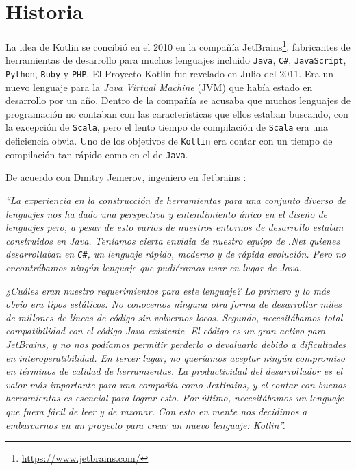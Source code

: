 \tableofcontents

\newpage

\section{Historia}
La idea de Kotlin se concibió en el 2010 en la compañía JetBrains\footnote{\url{https://www.jetbrains.com/}}, fabricantes de herramientas de desarrollo para muchos lenguajes incluido \texttt{Java}, \texttt{C\#}, \texttt{JavaScript}, \texttt{Python}, \texttt{Ruby} y \texttt{PHP}\cite{kotlin-in-action}. El Proyecto Kotlin fue revelado en Julio del 2011. Era un nuevo lenguaje para la \emph{Java Virtual Machine} (JVM) que había estado en desarrollo por un año\cite{krill}. Dentro de la compañía se acusaba que muchos lenguajes de programación no contaban con las características que ellos estaban buscando, con la excepción de \texttt{Scala}, pero el lento tiempo de compilación de \texttt{Scala} era una deficiencia obvia. Uno de los objetivos de \texttt{Kotlin} era contar con un tiempo de compilación tan rápido como en el de \texttt{Java}.

De acuerdo con Dmitry Jemerov, ingeniero en Jetbrains \cite{kotlin-in-action}: 

\emph{``La experiencia en la construcción de herramientas para una conjunto diverso de lenguajes nos ha dado una perspectiva y entendimiento único en el diseño de lenguajes pero, a pesar de esto varios de nuestros entornos de desarrollo estaban construidos en Java. Teníamos cierta envidia de nuestro equipo de .Net quienes desarrollaban en \texttt{C\#}, un lenguaje rápido, moderno y de rápida evolución. Pero no encontrábamos ningún lenguaje que pudiéramos usar en lugar de Java.}

\emph{¿Cuáles eran nuestro requerimientos para este lenguaje? Lo primero y lo más obvio era tipos estáticos. No conocemos ninguna otra forma de desarrollar miles de millones de líneas de código sin volvernos locos. Segundo, necesitábamos total compatibilidad con el código Java existente. El código es un gran activo para JetBrains, y no nos podíamos permitir perderlo o devaluarlo debido a dificultades en interoperatibilidad. En tercer lugar, no queríamos aceptar ningún compromiso en términos de calidad de herramientas. La productividad del desarrollador es el valor más importante para una compañía como JetBrains, y el contar con buenas herramientas es esencial para lograr esto. Por último, necesitábamos un lenguaje que fuera fácil de leer y de razonar. Con esto en mente nos decidimos a embarcarnos en un proyecto para crear un nuevo lenguaje: Kotlin''.}

